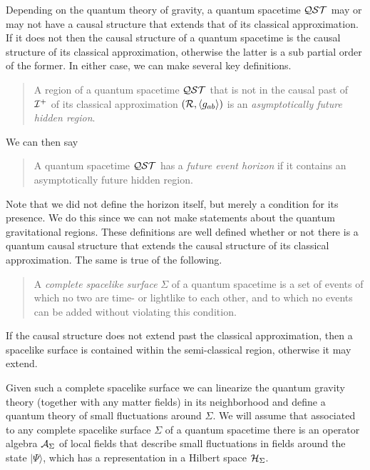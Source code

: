 \documentclass[12pt]{article}
\begin{document}
Depending on the quantum theory of gravity, a quantum spacetime ${\cal Q}{\cal S}{\cal T}$ may or may not have a causal structure that extends that of its  classical approximation. If it does not then the causal structure of a quantum spacetime is the causal structure of its classical approximation, otherwise the latter is a sub partial order of the former.  In either case, we can make several key definitions. 

\begin{quotation} 

A region of a quantum spacetime ${\cal Q}{\cal S}{\cal T}$ that is not in the causal past of ${\cal I}^+$ of its classical approximation $({\cal R}, \langle g_{ab} \rangle ) $ is an {\it asymptotically future hidden region}.

\end{quotation}

We can then say

\begin{quotation}
A quantum spacetime ${\cal Q}{\cal S}{\cal T}$ has a {\it future event horizon} if it contains an asymptotically future hidden region.
\end{quotation}

Note that we did not define the horizon itself, but merely a condition for its presence. We do this since we can not make
statements about the quantum gravitational regions. These definitions are well defined whether or not there is a quantum causal structure that extends the causal structure of its classical approximation.  The same is true of the following. 

\begin{quotation}
A {\it complete spacelike surface} $\Sigma$ of a quantum spacetime is a set of events of which no two are time- or lightlike to each other, 
and to which no events can be added without violating this condition.
\end{quotation}

If the causal structure does not extend past the classical approximation, then a spacelike surface is contained within the semi-classical region, otherwise it may extend.

Given such a complete spacelike surface we can linearize the quantum gravity theory (together with any matter fields) in its neighborhood and define a quantum theory of small fluctuations around $\Sigma$. We will assume that associated to any complete  spacelike surface $\Sigma$ of a quantum spacetime  there is an operator algebra
${\cal A}_\Sigma $ of local fields that describe small fluctuations in fields around the state $|\Psi \rangle $, which has a 
representation in a Hilbert space ${\cal H}_\Sigma $. 
\end{document}
